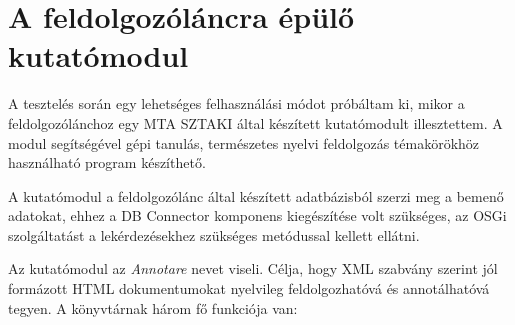 
\section{A feldolgozóláncra épülő kutatómodul}
\label{sec:researchbundle}

A tesztelés során egy lehetséges felhasználási módot próbáltam ki, mikor a feldolgozólánchoz egy MTA SZTAKI által készített kutatómodult illesztettem. A modul segítségével gépi tanulás, természetes nyelvi feldolgozás témakörökhöz használható program készíthető.

A kutatómodul a feldolgozólánc által készített adatbázisból szerzi meg a bemenő adatokat, ehhez a DB Connector komponens kiegészítése volt szükséges, az OSGi szolgáltatást a lekérdezésekhez szükséges metódussal kellett ellátni.

Az kutatómodul az \textit{Annotare} nevet viseli. Célja, hogy XML szabvány szerint jól formázott HTML dokumentumokat nyelvileg feldolgozhatóvá és annotálhatóvá tegyen. A könyvtárnak három fő funkciója van:

